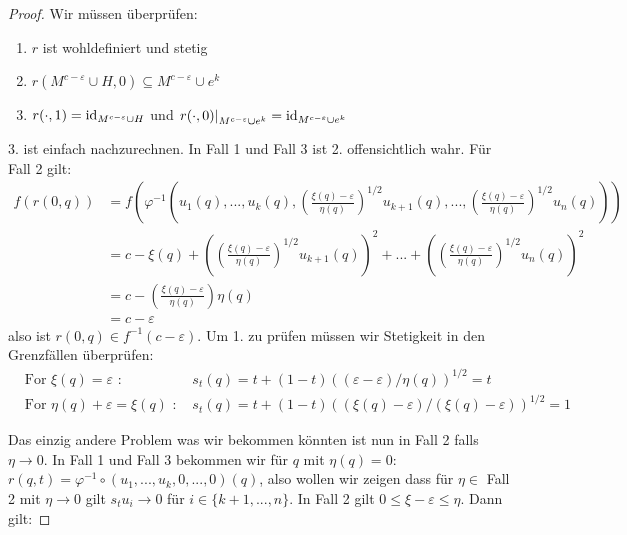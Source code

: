 \begin{proof}
    Wir müssen überprüfen:
    \begin{enumerate}
        \item $r$ ist wohldefiniert und stetig
        \item $r(M^{c - \varepsilon} \cup H, 0) \subseteq M^{c - \varepsilon} \cup e^k$
        \item $r(\cdot, 1) = { \operatorname{id} }_{M^{c - \varepsilon} \cup H}$ und 
            $\left. r(\cdot , 0) \right\vert_{M^{c - \varepsilon} \cup e^k} 
            = { \operatorname{id} }_{M^{c - \varepsilon} \cup e^k}$
    \end{enumerate}

    3. ist einfach nachzurechnen. In Fall 1 und Fall 3 ist 2. offensichtlich
    wahr. Für Fall 2 gilt:
    \begin{align*} 
        f(r(0, q)) & = 
            f\left( \varphi^{-1} \left(u_1(q), ..., u_k(q), 
            \left( \frac{\xi(q) - \varepsilon}{\eta(q)} \right)^{1/2}u_{k + 1}(q), ...,
            \left( \frac{\xi(q) - \varepsilon}{\eta(q)} \right)^{1/2}u_n(q)
            \right)
            \right) \\
        & = c - \xi(q)
            + \left( \left( \frac{\xi(q) - \varepsilon}{\eta(q)} \right)^{1/2}u_{k + 1}(q) \right)^2 + ... 
            + \left( \left( \frac{\xi(q) - \varepsilon}{\eta(q)} \right)^{1/2}u_n(q) \right)^2 \\
        & = c - \left( \frac{\xi(q) - \varepsilon}{\eta(q)} \right) \eta(q) \\
        & = c - \varepsilon
    \end{align*}
    also ist $r(0, q) \in f^{-1}(c - \varepsilon)$. Um 1. zu prüfen müssen wir 
    Stetigkeit in den Grenzfällen überprüfen:
    \begin{align*}
        & \text{For } \xi(q) = \varepsilon \text{ : }
            & s_t(q)  =t + (1 - t)((\varepsilon - \varepsilon)/\eta(q))^{1/2} = t \\
        & \text{For } \eta(q) + \varepsilon = \xi(q) \text{ : }
            & s_t(q) = t + (1 - t)((\xi(q) - \varepsilon)/(\xi(q) - \varepsilon))^{1/2} = 1
    \end{align*}

    Das einzig andere Problem was wir bekommen könnten ist nun in Fall 2 falls
    $\eta \to 0$. In Fall 1 und Fall 3 bekommen wir für $q$ mit $\eta(q) = 0$:
    $r(q, t) = \varphi^{-1} \circ (u_1, ..., u_k, 0, ..., 0)(q)$, also wollen
    wir zeigen dass für $\eta \in $ Fall 2 mit $\eta \to 0$ gilt $s_tu_i \to 0$
    für $i \in \{k+1, ..., n\}$. In Fall 2 gilt
    $0 \leq \xi - \varepsilon \leq \eta$. Dann gilt:


\end{proof}
